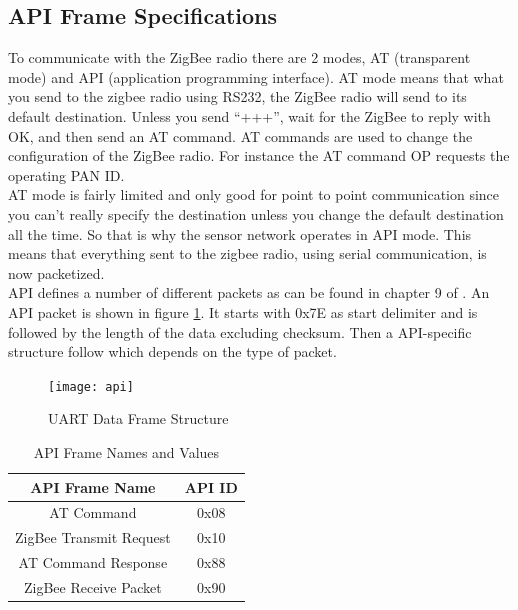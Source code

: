 
\subsection{API Frame Specifications}
To communicate with the ZigBee radio there are 2 modes, AT (transparent mode) and API (application programming interface). AT mode means that what you send to the zigbee radio using RS232, the ZigBee radio will send to its default destination. Unless you send “+++”, wait for the ZigBee to reply with OK, and then send an AT command. AT commands are used to change the configuration of the ZigBee radio. For instance the AT command OP requests the operating PAN ID.\\
AT mode is fairly limited and only good for point to point communication since you can’t really specify the destination unless you change the default destination all the time. So that is why the sensor network operates in API mode. This means that everything sent to the zigbee radio, using serial communication, is now packetized.\\
API defines a number of different packets as can be found in chapter 9 of . An API packet is shown in figure \ref{fig:api}. It starts with 0x7E as start delimiter and is followed by the length of the data excluding checksum. Then a API-specific structure follow which depends on the type of packet.\\
\begin{figure}[htbp]
\centering
\texttt{[image: api]}
\caption{UART Data Frame Structure}
\label{fig:api}
\end{figure} 
\begin{table}[!ht]
\begin{center}
\begin{tabular}[!ht]{|c|c|}
\hline
\textbf{API Frame Name} & \textbf{API ID}\\
\hline
AT Command & 0x08\\
\hline
ZigBee Transmit Request & 0x10\\
\hline
AT Command Response & 0x88\\
\hline
ZigBee Receive Packet & 0x90\\
\hline
\end{tabular}
\caption{API Frame Names and Values}
\label{tab:apis}
\end{center}
\end{table}\\
